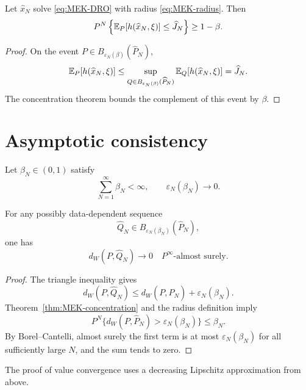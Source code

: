 \begin{theorem}\label{thm:MEK-finite-sample}
Let $\widehat x_N$ solve \eqref{eq:MEK-DRO} with radius \eqref{eq:MEK-radius}.  Then
\begin{equation}\label{eq:MEK-finite-guarantee}
 P^N\left\{
 \mathbb{E}_P[h(\widehat x_N,\xi)]\le\widehat J_N
 \right\}\ge1-\beta.
\end{equation}
\end{theorem}
\begin{proof}
On the event $P\in B_{\varepsilon_N(\beta)}(\widehat P_N)$,
\[
 \mathbb{E}_P[h(\widehat x_N,\xi)]
 \le\sup_{Q\in B_{\varepsilon_N(\beta)}(\widehat P_N)}
 \mathbb{E}_Q[h(\widehat x_N,\xi)]
 =\widehat J_N.
\]
The concentration theorem bounds the complement of this event by $\beta$.
\end{proof}

\section{Asymptotic consistency}
Let $\beta_N\in(0,1)$ satisfy
\begin{equation}\label{eq:MEK-beta-summable}
 \sum_{N=1}^\infty\beta_N<\infty,
 \qquad
 \varepsilon_N(\beta_N)\longrightarrow0.
\end{equation}

\begin{lemma}\label{lem:MEK-distribution-convergence}
For any possibly data-dependent sequence
\[
 \widehat Q_N\in B_{\varepsilon_N(\beta_N)}(\widehat P_N),
\]
one has
\[
 d_W(P,\widehat Q_N)\longrightarrow0
 \quad P^\infty\text{-almost surely}.
\]
\end{lemma}
\begin{proof}
The triangle inequality gives
\[
 d_W(P,\widehat Q_N)
 \le d_W(P,\widehat P_N)+\varepsilon_N(\beta_N).
\]
Theorem~\ref{thm:MEK-concentration} and the radius definition imply
\[
 P^N\{d_W(P,\widehat P_N)>\varepsilon_N(\beta_N)\}\le\beta_N.
\]
By Borel--Cantelli, almost surely the first term is at most $\varepsilon_N(\beta_N)$ for all sufficiently large $N$, and the sum tends to zero.
\end{proof}

The proof of value convergence uses a decreasing Lipschitz approximation from above.

